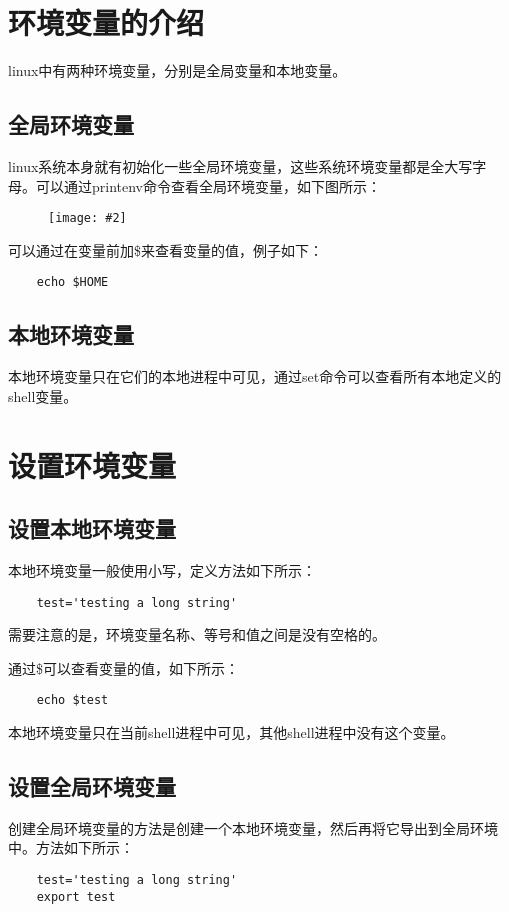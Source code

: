 \documentclass[a4paper,left=2.5cm,right=2.5cm,11pt]{article}
\newcommand{\sizedfic}[2]{\begin{figure}[H]
		\center
		\texttt{[image: \#2]}
	\end{figure}}
\begin{document}
\tableofcontents

\clearpage

\section{环境变量的介绍}
	linux中有两种环境变量，分别是全局变量和本地变量。

\subsection{全局环境变量}
	linux系统本身就有初始化一些全局环境变量，这些系统环境变量都是全大写字母。可以通过printenv命令查看全局环境变量，如下图所示：
	\sizedfic{1}{1.png}

	可以通过在变量前加\$来查看变量的值，例子如下：
	\begin{lstlisting}
	echo $HOME
	\end{lstlisting}

\subsection{本地环境变量}
	本地环境变量只在它们的本地进程中可见，通过set命令可以查看所有本地定义的shell变量。

\section{设置环境变量}
\subsection{设置本地环境变量}
	本地环境变量一般使用小写，定义方法如下所示：
	\begin{lstlisting}
	test='testing a long string'
	\end{lstlisting}

	需要注意的是，环境变量名称、等号和值之间是没有空格的。\par

	通过\$可以查看变量的值，如下所示：
	\begin{lstlisting}
	echo $test
	\end{lstlisting}

	本地环境变量只在当前shell进程中可见，其他shell进程中没有这个变量。

\subsection{设置全局环境变量}
	创建全局环境变量的方法是创建一个本地环境变量，然后再将它导出到全局环境中。方法如下所示：
	\begin{lstlisting}
	test='testing a long string'
	export test
	\end{lstlisting}
\end{document}
